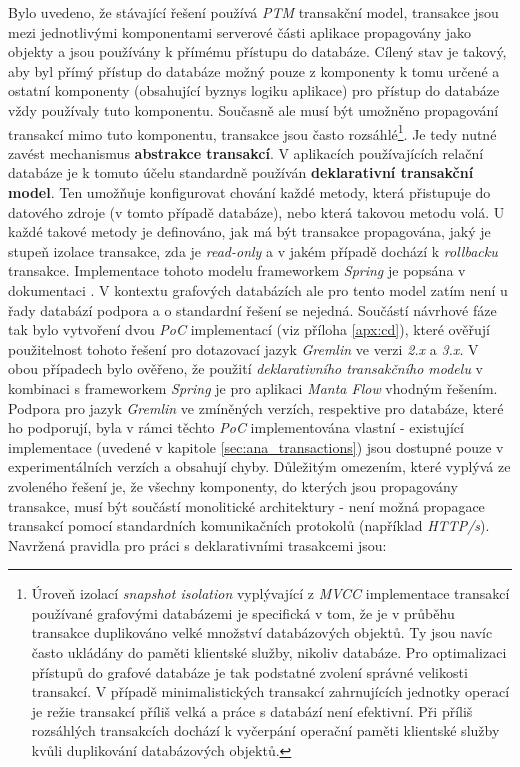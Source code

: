 Bylo uvedeno, že stávající řešení používá \textit{PTM} transakční model, transakce jsou mezi jednotlivými komponentami serverové části aplikace propagovány jako objekty a jsou používány k přímému přístupu do databáze. Cílený stav je takový, aby byl přímý přístup do databáze možný pouze z komponenty k tomu určené a ostatní komponenty (obsahující byznys logiku aplikace) pro přístup do databáze vždy používaly tuto komponentu. Současně ale musí být umožněno propagování transakcí mimo tuto komponentu, transakce jsou často rozsáhlé\footnote{Úroveň izolací \textit{snapshot isolation} vyplývající z \textit{MVCC} implementace transakcí používané grafovými databázemi je specifická v tom, že je v průběhu transakce duplikováno velké množství databázových objektů. Ty jsou navíc často ukládány do paměti klientské služby, nikoliv databáze. Pro optimalizaci přístupů do grafové databáze je tak podstatné zvolení správné velikosti transakcí. V případě minimalistických transakcí zahrnujících jednotky operací je režie transakcí příliš velká a práce s databází není efektivní. Při příliš rozsáhlých transakcích dochází k vyčerpání operační paměti klientské služby kvůli duplikování databázových objektů.}. Je tedy nutné zavést mechanismus \textbf{abstrakce transakcí}.
V aplikacích používajících relační databáze je k tomuto účelu standardně používán \textbf{deklarativní transakční model}. Ten umožňuje konfigurovat chování každé metody, která přistupuje do datového zdroje (v tomto případě databáze), nebo která takovou metodu volá. U každé takové metody je definováno, jak má být transakce propagována, jaký je stupeň izolace transakce, zda je \textit{read-only} a v jakém případě dochází k \textit{rollbacku} transakce. Implementace tohoto modelu frameworkem \textit{Spring} je popsána v dokumentaci \cite{SpringTransactions}.
V kontextu grafových databázích ale pro tento model zatím není u řady databází podpora a o standardní řešení se nejedná. Součástí návrhové fáze tak bylo vytvoření dvou \textit{PoC} implementací (viz příloha \ref{apx:cd}), které ověřují použitelnost tohoto řešení pro dotazovací jazyk \textit{Gremlin} ve verzi \textit{2.x} a \textit{3.x}. V obou případech bylo ověřeno, že použití \textit{deklarativního transakčního modelu} v kombinaci s frameworkem \textit{Spring} je pro aplikaci \textit{Manta Flow} vhodným řešením. Podpora pro jazyk \textit{Gremlin} ve zmíněných verzích, respektive pro databáze, které ho podporují, byla v rámci těchto \textit{PoC} implementována vlastní - existující implementace (uvedené v kapitole \ref{sec:ana_transactions}) jsou dostupné pouze v experimentálních verzích a obsahují chyby.
Důležitým omezením, které vyplývá ze zvoleného řešení je, že všechny komponenty, do kterých jsou propagovány transakce, musí být součástí monolitické architektury - není možná propagace transakcí pomocí standardních komunikačních protokolů (například \textit{HTTP/s}). Navržená pravidla pro práci s deklarativními trasakcemi jsou:

